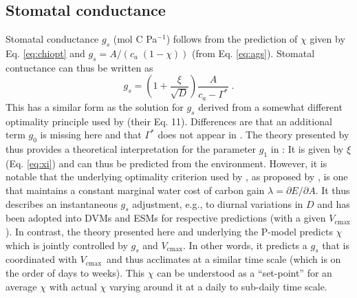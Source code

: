 \documentclass[gmd, manuscript]{copernicus}
\newcommand{\vcmax}{$V_{\text{cmax}}$}
\begin{document}
\subsection{Stomatal conductance}
\label{sec:gs}
Stomatal conductance $g_s$ (mol C Pa$^{-1}$) follows from the prediction of $\chi$ given by Eq. \ref{eq:chiopt} and $g_s = A / ( c_a\;(1-\chi) )$ (from Eq. \ref{eq:ags}). Stomatal contuctance can thus be written as
\begin{equation}
\label{eq:gs}
    g_s = \left( 1 + \frac{\xi}{\sqrt{D}} \right) \frac{A}{c_a - \Gamma^\ast}\;.
\end{equation}
This has a similar form as the solution for $g_s$ derived from a somewhat different optimality principle used by \citet{medlyn11gcb} (their Eq. 11). Differences are that an additional term $g_0$ is missing here and that $\Gamma^\ast$ does not appear in \citet{medlyn11gcb}. The theory presented by \citet{prentice14ecollett} thus provides a theoretical interpretation for the parameter $g_1$ in \citet{medlyn11gcb}: It is given by $\xi$ (Eq. \ref{eq:xi}) and can thus be predicted from the environment. However, it is notable that the underlying optimality criterion used by \citet{medlyn11gcb}, as proposed by \citet{Cowan1977-ud}, is one that maintains a constant marginal water cost of carbon gain $\lambda = \partial E / \partial A$. It thus describes an instantaneous $g_s$ adjustment, e.g., to diurnal variations in $D$ and has been adopted into DVMs and ESMs for respective predictions (with a given \vcmax ). In contrast, the theory presented here and underlying the P-model predicts $\chi$ which is jointly controlled by $g_s$ and \vcmax . In other words, it predicts a $g_s$ that is coordinated with \vcmax\ and thus acclimates at a similar time scale (which is on the order of days to weeks). This $\chi$ can be understood as a ``set-point'' for an average $\chi$ with actual $\chi$ varying around it at a daily to sub-daily time scale.

\end{document}
